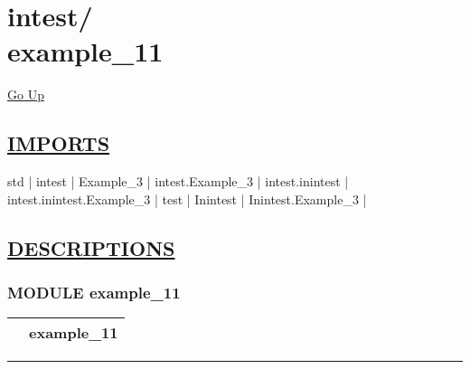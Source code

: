 \chapter*{\color{headfile}
{\large intest\slash\hspace{0pt}}
 \\
example_11
}
\hypertarget{ecldoc:toc:intest.example_11}{}
\hyperlink{ecldoc:toc:root/intest}{Go Up}

\section*{\underline{\textsf{IMPORTS}}}
\begin{doublespace}
{\large
std |
intest |
Example\_3 |
intest.Example\_3 |
intest.inintest |
intest.inintest.Example\_3 |
test |
Inintest |
Inintest.Example\_3 |
}
\end{doublespace}

\section*{\underline{\textsf{DESCRIPTIONS}}}
\subsection*{\textsf{\colorbox{headtoc}{\color{white} MODULE}
example\_11}}

\hypertarget{ecldoc:intest.example_11}{}

{\renewcommand{\arraystretch}{1.5}
\begin{tabularx}{\textwidth}{|>{\raggedright\arraybackslash}l|X|}
\hline
\hspace{0pt}\mytexttt{\color{red} } & \textbf{example\_11} \\
\hline
\end{tabularx}
}

\par


\rule{\linewidth}{0.5pt}
